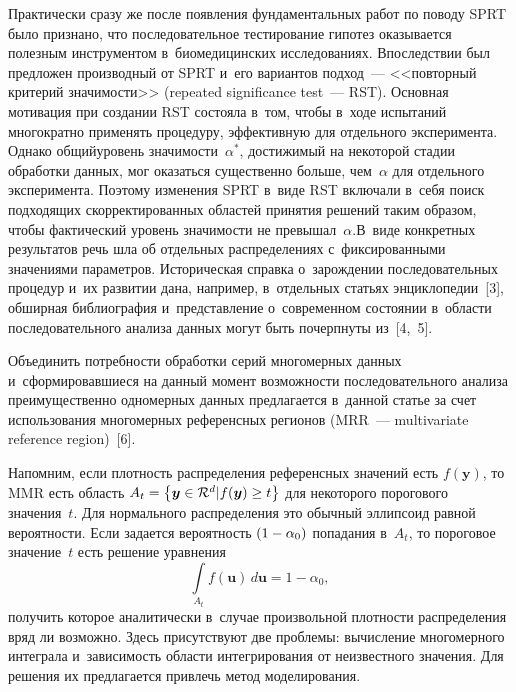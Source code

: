\begin{multicols}{2}
     Практически сразу же после появления фундаментальных работ по 
поводу SPRT было признано, что последовательное тестирование гипотез\linebreak 
оказывается полезным инструментом в~биомедицинских исследованиях. 
Впоследствии был предложен производный от SPRT и~его вариантов 
подход~--- <<повторный критерий значимости>> (\mbox{repeated} significance test~--- RST). 
Основная мотивация при создании RST состояла в~том, чтобы в~ходе 
испытаний многократно применять процедуру, эффективную для отдельного 
эксперимента. Однако общий\linebreak уровень значимости~$\alpha^*$, достижимый на 
некоторой стадии обработки данных, мог оказаться существенно больше, 
чем~$\alpha$ для отдельного эксперимента. Поэтому изменения SPRT в~виде 
RST \mbox{включали} в~себя поиск подходящих скорректированных об\-ла\-стей 
принятия решений таким образом, чтобы фактический уровень значимости не 
превышал~$\alpha$.\linebreak В~виде конкретных результатов речь шла об отдельных 
распределениях с~фиксированными значениями параметров. Историческая 
справка о~зарож\-дении последовательных процедур и~их развитии дана, 
например, в~отдельных стать\-ях энциклопедии~[3], обширная биб\-лио\-гра\-фия 
и~представление о~современном состоянии в~об\-ласти последовательного 
анализа данных могут быть почерпнуты из~[4,~5].
     
     Объединить потребности обработки серий многомерных данных 
и~сформировавшиеся на данный момент возможности последовательного 
анализа преимущественно одномерных данных предлагается в~данной статье 
за счет использования многомерных референсных регионов
 (MRR~--- 
multivariate reference region)~[6].
      
     Напомним, если плотность распределения референсных значений есть 
$f(\boldsymbol{y})$, то MMR
 есть область $A_t\hm= \left\{ \boldsymbol{y}\hm\in 
\mathcal{R}^d\vert f(\boldsymbol{y})\hm\geq t\right\}$ для некоторого 
порогового значения~$t$. Для нормального распределения это обычный 
эллипсоид равной вероятности. Если задается вероятность $(1\hm-\alpha_0)$ 
попадания в~$A_t$, то пороговое значение~$t$ есть решение уравнения 
$$
\int\limits_{A_t} f(\boldsymbol{u})\,d\boldsymbol{u}=1-
\alpha_0,
$$
 получить которое аналитически в~случае произвольной плот\-ности 
распределения вряд ли возможно. Здесь присутствуют две проб\-ле\-мы: 
вычисление многомерного интеграла и~зависимость об\-ласти интегрирования 
от неизвестного значения. Для решения их предлагается привлечь метод 
моделирования.
     

\end{multicols}
